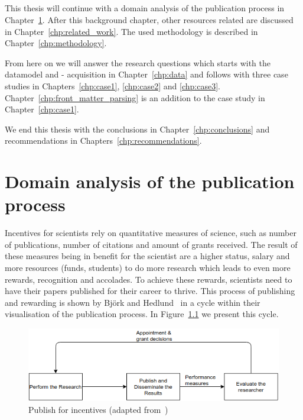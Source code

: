 \documentclass{ou-report}
\newcommand{\outline}[1]{{\color{blue} #1}}
\begin{document}
\paragraph{}
This thesis will continue with a domain analysis of the publication process in
Chapter~\ref{chp:domainanalysis}. After this background chapter, other 
resources related are discussed in Chapter~\ref{chp:related_work}. The used
methodology is described in Chapter~\ref{chp:methodology}. 

From here on we will
answer the research questions which starts with the datamodel and - acquisition
in Chapter~\ref{chp:data} and follows with three case studies in 
Chapters~\ref{chp:case1}, \ref{chp:case2} and \ref{chp:case3}. 
Chapter~\ref{chp:front_matter_parsing} is an addition to the case study in 
Chapter~\ref{chp:case1}.

We end this thesis with the conclusions in Chapter~\ref{chp:conclusions} and
recommendations in Chapters~\ref{chp:recommendations}.



\chapter{Domain analysis of the publication process}
\label{chp:domainanalysis}

Incentives for scientists rely on quantitative measures of science, such as 
number of publications, number of citations and amount of grants received. The
result of these measures being in benefit for the scientist are a higher status, 
salary and more resources (funds, students) to do 
more research which leads to even more rewards, recognition and accolades. To 
achieve these rewards, scientists need to have their papers published for their 
career to thrive. This process of publishing and rewarding is shown by Bj\"ork 
and Hedlund~\cite{BH2004} in a cycle within their visualisation of the 
publication process. In Figure~\ref{fig:publish_incentives} we present this 
cycle.

\begin{figure}[H]
\centering
\includegraphics[width=12cm]{images/publication_process.drawio.png}
\caption{Publish for incentives (adapted from~\cite{BH2004})}
\label{fig:publish_incentives}
\end{figure}
\end{document}
